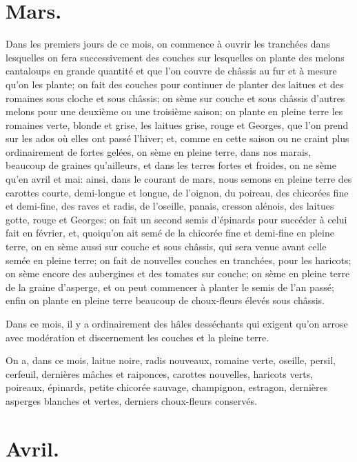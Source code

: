 \documentclass[10pt,a4paper]{book}
\begin{document}
\section{Mars.}

Dans les premiers jours de ce mois, on commence à ouvrir les tranchées dans lesquelles on fera successivement des couches sur lesquelles on plante des melons cantaloups en grande quantité et que l'on couvre de châssis au fur et à mesure qu'on les plante; on fait des couches pour continuer de planter des laitues et des romaines sous cloche et sous châssis; on sème sur couche et sous châssis d'autres melons pour une deuxième ou une troisième saison; on plante en pleine terre les romaines verte, blonde et grise, les laitues grise, rouge et Georges, que l'on prend sur les ados où elles ont passé l'hiver; et, comme en cette saison ou ne craint plus ordinairement de fortes gelées, on sème en pleine terre, dans nos marais, beaucoup de graines qu'ailleurs, et dans les terres fortes et froides, on ne sème qu'en avril et mai: ainsi, dans le courant de mars, nous semons en pleine terre des carottes courte, demi-longue et longue, de l'oignon, du poireau, des chicorées fine et demi-fine, des raves et radis, de l'oseille, panais, cresson alénois, des laitues gotte, rouge et Georges; on fait un second semis d'épinards pour succéder à celui fait en février, et, quoiqu'on ait semé de la chicorée fine et demi-fine en pleine terre, on en sème aussi sur couche et sous châssis, qui sera venue avant celle semée en pleine terre; on fait de nouvelles couches en tranchées, pour les haricots; on sème encore des aubergines et des tomates sur couche; on sème en pleine terre de la graine d'asperge, et on peut commencer à planter le semis de l'an passé; enfin on plante en pleine terre beaucoup de choux-fleurs élevés sous châssis.

Dans ce mois, il y a ordinairement des hâles desséchants qui exigent qu'on arrose avec modération et discernement les couches et la pleine terre.

On a, dans ce mois, laitue noire, radis nouveaux, romaine verte, oseille, persil, cerfeuil, dernières mâches et raiponces, carottes nouvelles, haricots verts, poireaux, épinards, petite chicorée sauvage, champignon, estragon, dernières asperges blanches et vertes, derniers choux-fleurs conservés.

\section{Avril.}
\end{document}
